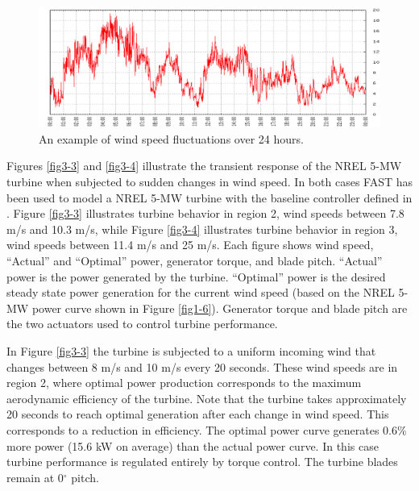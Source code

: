 \begin{figure}[htbp]
	\centering
		\includegraphics[width=\linewidth]{Figures/ch3Figures/fig3-2.png}
		
	\caption{An example of wind speed fluctuations over 24 hours.\cite{NWTC2013}}
	\label{fig3-2}
\end{figure}

Figures  \ref{fig3-3} and  \ref{fig3-4} illustrate the transient response of the NREL 5-MW turbine when subjected to sudden changes in wind speed. In both cases FAST has been used to model a NREL 5-MW turbine with the baseline controller defined in \cite{jonkman2009}. Figure \ref{fig3-3} illustrates turbine behavior in region 2, wind speeds between 7.8 m/s and 10.3 m/s, while Figure \ref{fig3-4} illustrates turbine behavior in region 3, wind speeds between 11.4 m/s and 25 m/s.  Each figure shows wind speed, “Actual” and “Optimal” power, generator torque, and blade pitch. “Actual” power is the power generated by the turbine. “Optimal” power is the desired steady state power generation for the current wind speed (based on the NREL 5-MW power curve shown in Figure \ref{fig1-6}). Generator torque and blade pitch are the two actuators used to control turbine performance. 

In Figure \ref{fig3-3} the turbine is subjected to a uniform incoming wind that changes between 8 m/s and 10 m/s every 20 seconds. These wind speeds are in region 2, where optimal power production corresponds to the maximum aerodynamic efficiency of the turbine. Note that the turbine takes approximately 20 seconds to reach optimal generation after each change in wind speed. This corresponds to a reduction in efficiency.  The optimal power curve generates 0.6\% more power (15.6 kW on average) than the actual power curve. In this case turbine performance is regulated entirely by torque control. The turbine blades remain at 0$^{\circ}$ pitch. 

